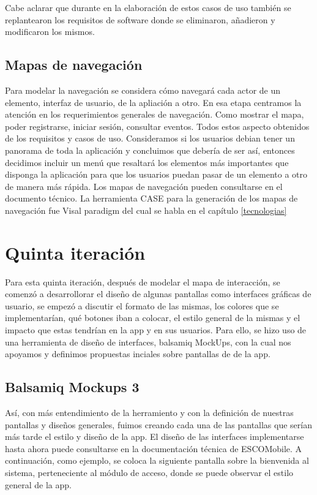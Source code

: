 \noindent
Cabe aclarar que durante en la elaboración de estos casos de uso también se replantearon los requisitos de software donde se eliminaron, añadieron y modificaron los mismos.

\subsection{Mapas de navegación}
\noindent
Para modelar la navegación se considera cómo navegará cada actor de un elemento, interfaz de usuario, de la apliación a otro. En esa etapa centramos la atención en los requerimientos generales de navegación. Como mostrar el mapa, poder registrarse, iniciar sesión, consultar eventos. Todos estos aspecto obtenidos de los requisitos y casos de uso. Consideramos si los usuarios debian tener un panorama de toda la aplicación y concluimos que debería de ser así, entonces decidimos incluir un menú que resaltará los elementos más importantes que disponga la aplicación para que los usuarios puedan pasar de un elemento a otro de manera más rápida. Los mapas de navegación pueden consultarse en el documento técnico. La herramienta CASE para la generación de los mapas de navegación fue Visal paradigm del cual se habla en el capítulo \ref{tecnologias}

\newpage
\section{Quinta iteración}

\noindent
Para esta quinta iteración, después de modelar el mapa de interacción, se comenzó a desarrollorar el diseño de algunas pantallas como interfaces gráficas de usuario, se empezó a discutir el formato de las mismas, los colores que se implementarían, qué botones iban a colocar, el estilo general de la mismas y el impacto que estas tendrían en la app y en sus usuarios. Para ello, se hizo uso de una herramienta de diseño de interfaces, balsamiq MockUps, con la cual nos apoyamos y definimos propuestas inciales sobre pantallas de de la app. 

\subsection{Balsamiq Mockups 3}


Así, con más entendimiento de la herramiento y con la definición de nuestras pantallas y diseños generales, fuimos creando cada una de las pantallas que serían más tarde el estilo y diseño de la app. 
El diseño de las interfaces implementarse hasta ahora puede consultarse en la documentación técnica de ESCOMobile. A continuación, como ejemplo, se coloca la siguiente pantalla sobre la bienvenida al sistema, perteneciente al módulo de acceso, donde se puede observar el estilo general de la app.  

